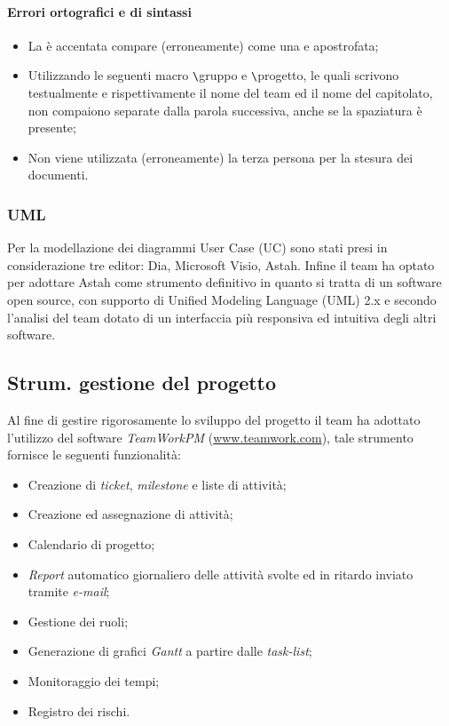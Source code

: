 \paragraph{Errori ortografici e di sintassi}
\begin{itemize}
\item La è accentata compare (erroneamente) come una e apostrofata;
\item Utilizzando le seguenti macro \verb+\+gruppo e \verb+\+progetto, le quali scrivono testualmente e rispettivamente il nome del team ed il nome del capitolato, non compaiono separate dalla parola successiva, anche se la spaziatura è presente;
\item Non viene utilizzata (erroneamente) la terza persona per la stesura dei documenti.
\end{itemize}
\subsubsection{UML}
Per la modellazione dei diagrammi User Case (UC) sono stati presi in considerazione tre editor: Dia, Microsoft Visio, Astah. Infine il team ha optato per adottare Astah come strumento definitivo in quanto si tratta di un software open source, con supporto di Unified Modeling Language (UML) 2.x  e secondo l'analisi del team dotato di un interfaccia più responsiva ed intuitiva degli altri software.
\subsection{Strum. gestione del progetto}
Al fine di gestire rigorosamente lo sviluppo del progetto il team \gruppo{} ha adottato l'utilizzo del software \textit{TeamWorkPM} (\href{http://www.teamwork.com}{www.teamwork.com}), tale strumento fornisce le seguenti funzionalità:

\begin{itemize}
\item Creazione di \textit{ticket}, \textit{milestone} e liste di attività;
\item Creazione ed assegnazione di attività;
\item Calendario di progetto;
\item \textit{Report} automatico giornaliero delle attività svolte ed in ritardo inviato tramite \textit{e-mail};
\item Gestione dei ruoli;
\item Generazione di grafici \textit{Gantt} a partire dalle \textit{task-list};
\item Monitoraggio dei tempi;
\item Registro dei rischi.
\end{itemize}

